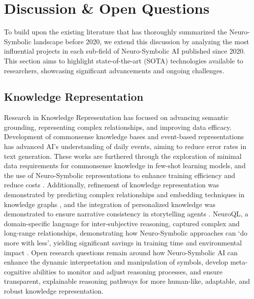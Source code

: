 \documentclass[hf]{ceurart}
\begin{document}
\section{Discussion \& Open Questions}\label{sec:discussion}
To build upon the existing literature that has thoroughly summarized the Neuro-Symbolic landscape before 2020, we extend this discussion by analyzing the most influential projects in each sub-field of Neuro-Symbolic AI published since 2020. This section aims to highlight state-of-the-art (SOTA) technologies available to researchers, showcasing significant advancements and ongoing challenges. 

\subsection{Knowledge Representation}\label{subsec:disc_knowledge}
Research in Knowledge Representation has focused on advancing semantic grounding, representing complex relationships, and improving data efficacy. Development of commonsense knowledge bases and event-based representations \cite{Mostafazadeh2020, Hwang2021, Ismayilzada2022} has advanced AI's understanding of daily events, aiming to reduce error rates in text generation. These works are furthered through the exploration of minimal data requirements for commonsense knowledge in few-shot learning models\cite{Ribeiro2021}, and the use of Neuro-Symbolic representations to enhance training efficiency and reduce costs \cite{Ahmed2022}. Additionally, refinement of knowledge representation was demonstrated by predicting complex relationships and embedding techniques in knowledge graphs \cite{Chen2023, Perevalov2022}, and the integration of personalized knowledge was demonstrated to ensure narrative consistency in storytelling agents \cite{Gao2023}. NeuroQL, a domain-specific language for inter-subjective reasoning, captured complex and long-range relationships, demonstrating how Neuro-Symbolic approaches can `do more with less', yielding significant savings in training time and environmental impact \cite{Papoulias2023}. Open research questions remain around how Neuro-Symbolic AI can enhance the dynamic interpretation and manipulation of symbols, develop meta-cognitive abilities to monitor and adjust reasoning processes, and ensure transparent, explainable reasoning pathways for more human-like, adaptable, and robust knowledge representation.
\end{document}
